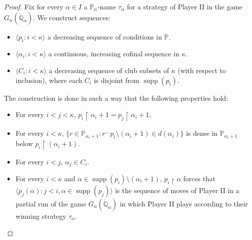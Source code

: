 \documentclass[10pt,a4paper]{amsart}
\newcommand{\la}{\langle}
\newcommand{\po}{\mathbb{P}}
\newcommand{\qo}{\mathbb{Q}}
\newcommand{\ra}{\rangle}
\renewcommand{\restriction}{\mathbin\upharpoonright}    %
\DeclareMathOperator{\supp}{supp}
\begin{document}
\begin{proof}
    Fix for every $\alpha\in I$ a $\po_\alpha$-name $\dot{\tau}_\alpha$ for a strategy of Player II in the game $G_{\alpha}( \dot{\qo}_\alpha)$.
    We construct sequences:
    \begin{itemize}
        \item $\la  p_i \colon i<\kappa\ra$ a decreasing  sequence of conditions in $\po$.
        \item $\la \alpha_i \colon i<\kappa \ra$ a continuous, increasing cofinal sequence in $\kappa$.
        \item $\la C_i \colon i<\kappa \ra$ a decreasing sequence of club subsets of $\kappa$ (with respect to inclusion), where each $C_i$ is disjoint from $\supp(p_i)$. 
    \end{itemize}
    The construction is done in such a way that the following properties hold:
    \begin{itemize}
        \item For every $i<j<\kappa$, $p_{i}\restriction \alpha_i+1 = p_j \restriction \alpha_i+1$.
        \item For every $i<\kappa$, $\{ r\in \po_{\alpha_{i}+1} \colon r^{\frown} p_{i}\setminus (\alpha_i+1) \in d(\alpha_i) \}$ is dense in $\po_{\alpha_i+1}$ below $p_i\restriction (\alpha_i+1)$.
        \item For every $i<j$, $\alpha_j \in C_i$. 
        \item For every $i<\kappa$ and $\alpha\in \supp(p_i)\setminus (\alpha_i+1)$, $p_i\restriction \alpha$ forces that $\la p_{j}(\alpha) \colon j<i, \alpha\in \supp(p_j) \ra$ is the sequence of moves of Player II in a partial run of the game $G_\alpha(\dot{\qo}_\alpha)$ in which Player II plays according to their winning strategy $\dot{\tau}_\alpha$.
    \end{itemize}
    

\end{proof}
\end{document}
